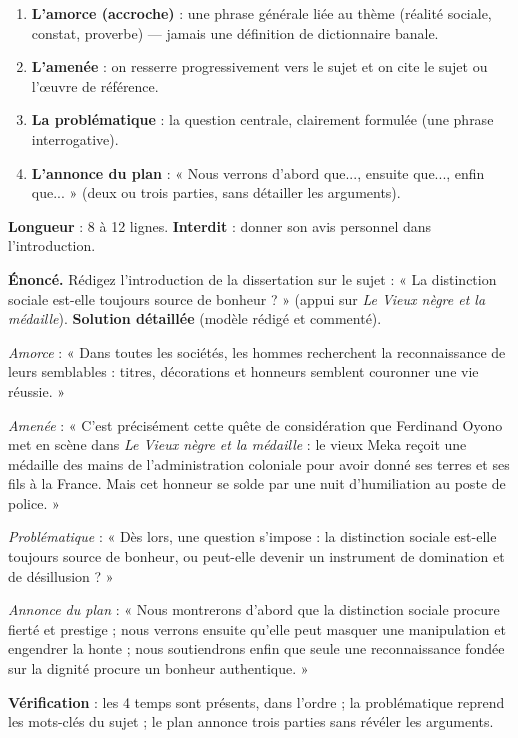 \documentclass[11pt]{article}
\begin{document}
\begin{methode}
\begin{enumerate}
\item \textbf{L'amorce (accroche)} : une phrase générale liée au thème (réalité sociale, constat, proverbe) — jamais une définition de dictionnaire banale.
\item \textbf{L'amenée} : on resserre progressivement vers le sujet et on cite le sujet ou l'œuvre de référence.
\item \textbf{La problématique} : la question centrale, clairement formulée (une phrase interrogative).
\item \textbf{L'annonce du plan} : « Nous verrons d'abord que..., ensuite que..., enfin que... » (deux ou trois parties, sans détailler les arguments).
\end{enumerate}
\textbf{Longueur} : 8 à 12 lignes. \textbf{Interdit} : donner son avis personnel dans l'introduction.
\end{methode}

\begin{exoresolu}
\textbf{Énoncé.} Rédigez l'introduction de la dissertation sur le sujet : « La distinction sociale est-elle toujours source de bonheur ? » (appui sur \emph{Le Vieux nègre et la médaille}).
\tcblower
\textbf{Solution détaillée} (modèle rédigé et commenté).

\emph{Amorce} : « Dans toutes les sociétés, les hommes recherchent la reconnaissance de leurs semblables : titres, décorations et honneurs semblent couronner une vie réussie. »

\emph{Amenée} : « C'est précisément cette quête de considération que Ferdinand Oyono met en scène dans \emph{Le Vieux nègre et la médaille} : le vieux Meka reçoit une médaille des mains de l'administration coloniale pour avoir donné ses terres et ses fils à la France. Mais cet honneur se solde par une nuit d'humiliation au poste de police. »

\emph{Problématique} : « Dès lors, une question s'impose : la distinction sociale est-elle toujours source de bonheur, ou peut-elle devenir un instrument de domination et de désillusion ? »

\emph{Annonce du plan} : « Nous montrerons d'abord que la distinction sociale procure fierté et prestige ; nous verrons ensuite qu'elle peut masquer une manipulation et engendrer la honte ; nous soutiendrons enfin que seule une reconnaissance fondée sur la dignité procure un bonheur authentique. »

\textbf{Vérification} : les 4 temps sont présents, dans l'ordre ; la problématique reprend les mots-clés du sujet ; le plan annonce trois parties sans révéler les arguments.
\end{exoresolu}
\end{document}
